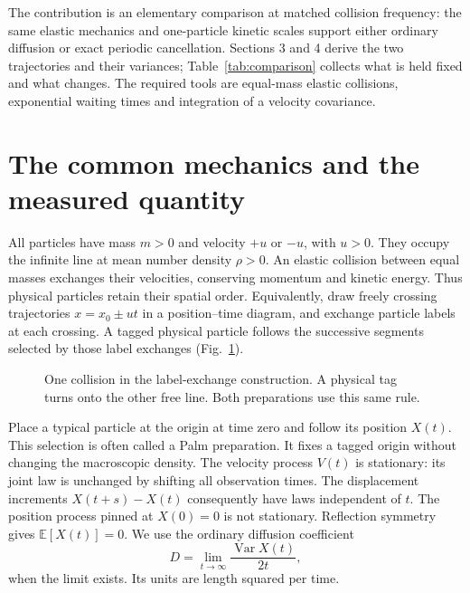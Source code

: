 \documentclass[11pt,a4paper]{article}
\newcommand{\Var}{\operatorname{Var}}
\begin{document}
The contribution is an elementary comparison at matched collision frequency:
the same elastic mechanics and one-particle kinetic scales support either
ordinary diffusion or exact periodic cancellation. Sections 3 and 4 derive
the two trajectories and their variances; Table~\ref{tab:comparison} collects
what is held fixed and what changes. The required tools are equal-mass elastic
collisions, exponential waiting times and integration of a velocity covariance.

\section{The common mechanics and the measured quantity}
All particles have mass $m>0$ and velocity $+u$ or $-u$, with $u>0$.
They occupy the infinite line at mean number density $\rho>0$.
An elastic collision between equal masses exchanges their velocities,
conserving momentum and kinetic energy. Thus physical particles retain their
spatial order. Equivalently, draw freely crossing trajectories $x=x_0\pm ut$
in a position--time diagram, and exchange particle labels at each crossing.
A tagged physical particle follows the successive segments selected by those
label exchanges (Fig.~\ref{fig:exchange}).

\begin{figure}[ht]
\centering
{}
\caption{One collision in the label-exchange construction. A physical tag
turns onto the other free line. Both preparations use this same rule.}
\label{fig:exchange}
\end{figure}

Place a typical particle at the origin at time zero and follow its position
$X(t)$. This selection is often called a Palm preparation. It fixes a tagged
origin without changing the macroscopic density. The velocity process $V(t)$
is stationary: its joint law is unchanged by shifting all observation times.
The displacement increments $X(t+s)-X(t)$ consequently have laws independent
of $t$. The position process pinned at $X(0)=0$ is not stationary.
Reflection symmetry gives
$\mathbb E[X(t)]=0$. We use the ordinary diffusion coefficient
\begin{equation}
 D=\lim_{t\to\infty}\frac{\Var X(t)}{2t},
 \label{eq:D}
\end{equation}
when the limit exists. Its units are length squared per time.
\end{document}
